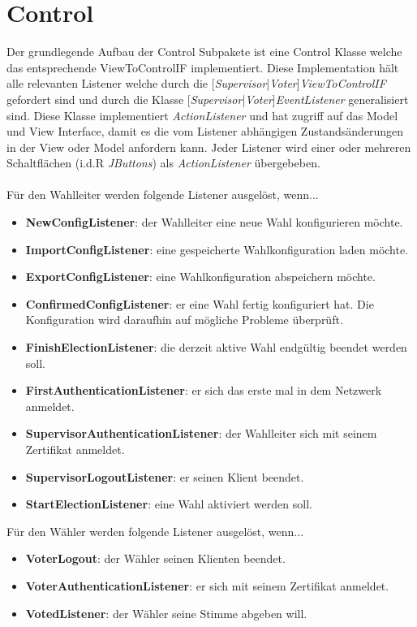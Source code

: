 \documentclass[parskip=full]{scrartcl}
\newcommand{\textitx}[1]{\mbox{\textit{#1}}}
\newcommand{\fakeparagraph}[1]{\textbf{#1}}
\begin{document}
	\section{Control}
	Der grundlegende Aufbau der Control Subpakete ist eine Control Klasse welche das entsprechende ViewToControlIF implementiert. Diese Implementation hält alle relevanten Listener welche durch die [\textitx{Supervisor}|\textitx{Voter}]\textitx{ViewToControlIF} gefordert sind und durch die Klasse [\textitx{Supervisor}|\textitx{Voter}]\textitx{EventListener} generalisiert sind. Diese Klasse implementiert \textitx{ActionListener} und hat zugriff auf das Model und View Interface, damit es die vom Listener abhängigen Zustandsänderungen in der View oder Model anfordern kann. Jeder Listener wird einer oder mehreren Schaltflächen (i.d.R \textitx{JButtons}) als \textitx{ActionListener} übergebeben.\\
	\\
	Für den Wahlleiter werden folgende Listener ausgelöst, wenn...
	\begin{itemize}
		\item\fakeparagraph{NewConfigListener}: der Wahlleiter eine neue Wahl konfigurieren möchte.
		\item\fakeparagraph{ImportConfigListener}: eine gespeicherte Wahlkonfiguration laden möchte.
		\item\fakeparagraph{ExportConfigListener}: eine Wahlkonfiguration abspeichern möchte.
		\item\fakeparagraph{ConfirmedConfigListener}: er eine Wahl fertig konfiguriert hat. Die Konfiguration wird daraufhin auf mögliche Probleme überprüft.
		\item\fakeparagraph{FinishElectionListener}: die derzeit aktive Wahl endgültig beendet werden soll. 
		\item\fakeparagraph{FirstAuthenticationListener}: er sich das erste mal in dem Netzwerk anmeldet.
		\item\fakeparagraph{SupervisorAuthenticationListener}: der Wahlleiter sich mit seinem Zertifikat anmeldet.
		\item\fakeparagraph{SupervisorLogoutListener}: er seinen Klient beendet.
		\item\fakeparagraph{StartElectionListener}: eine Wahl aktiviert werden soll.
	\end{itemize}
	
	Für den Wähler werden folgende Listener ausgelöst, wenn...
	\begin{itemize}
		\item\fakeparagraph{VoterLogout}: der Wähler seinen Klienten beendet.
		\item\fakeparagraph{VoterAuthenticationListener}: er sich mit seinem Zertifikat anmeldet.
		\item\fakeparagraph{VotedListener}: der Wähler seine Stimme abgeben will.
	\end{itemize}
  
\end{document}
